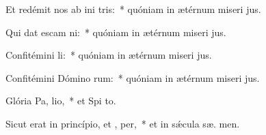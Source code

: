 \item Et redémit nos ab ini tris:~* quóniam in ætérnum miseri jus.
\item Qui dat escam  ni:~* quóniam in ætérnum miseri jus.
\item Confitémini  li:~* quóniam in ætérnum miseri jus.
\item Confitémini Dómino rum:~* quóniam in ætérnum miseri jus.
\item Glória Pa,  lio,~* et Spi to.
\item Sicut erat in princípio, et ,  per,~* et in sǽcula sæ. men.
